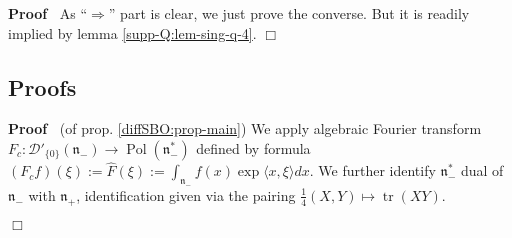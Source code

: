 \documentclass{article}
\newcommand{\assign}{:=}
\newcommand{\tmop}[1]{\ensuremath{\operatorname{#1}}}
\newenvironment{proof}{\noindent\textbf{Proof\ }}{\hspace*{\fill}$\Box$\medskip}
\numberwithin{definition}{section}
\numberwithin{lemma}{section}
\numberwithin{proposition}{section}
{\theorembodyfont{\rmfamily}\newtheorem{remark}{Remark}
\numberwithin{remark}{section}
}
\begin{document}
\begin{proof}
  As ``$\Rightarrow$'' part is clear, we just prove the converse. But it is
  readily implied by lemma \ref{supp-Q:lem-sing-q-4}.
\end{proof}

\subsection{Proofs}

\begin{proof}
  (of prop. \ref{diffSBO:prop-main}) We apply algebraic Fourier transform $F_c
  : \mathcal{D}'_{\{ 0 \}} ( \mathfrak{n}_-) \rightarrow \tmop{Pol} (
  \mathfrak{n}_-^{\ast})^{}$ defined by formula $( F_c f) ( \xi) \assign
  \hat{F} ( \xi) \assign \int_{\mathfrak{n}_-}^{} f ( x) \exp \langle x, \xi
  \rangle d x$. We further identify $\mathfrak{n}_-^{\ast}$ dual of
  $\mathfrak{n}_-$ with $\mathfrak{n}_+$, identification given via the pairing
  $\frac{1}{4} ( X, Y) \mapsto \tmop{tr} ( X Y)$.
  

\end{proof}
\end{document}
